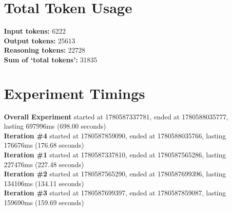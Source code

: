 \documentclass{article}
\begin{document}
\section*{Total Token Usage}
\textbf{Input tokens: }6222
\\\textbf{Output tokens: }25613
\\\textbf{Reasoning tokens: }22728
\\\textbf{Sum of `total tokens': }31835
\section*{Experiment Timings}
\textbf{Overall Experiment} started at 1780587337781, ended at 1780588035777, lasting 697996ms (698.00 seconds)
\\\textbf{Iteration \#4} started at 1780587859090, ended at 1780588035766, lasting 176676ms (176.68 seconds)
\\\textbf{Iteration \#1} started at 1780587337810, ended at 1780587565286, lasting 227476ms (227.48 seconds)
\\\textbf{Iteration \#2} started at 1780587565290, ended at 1780587699396, lasting 134106ms (134.11 seconds)
\\\textbf{Iteration \#3} started at 1780587699397, ended at 1780587859087, lasting 159690ms (159.69 seconds)
\end{document}
